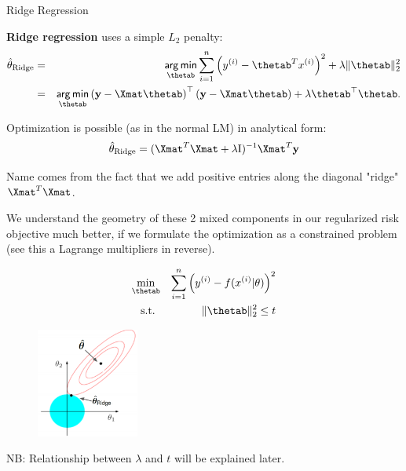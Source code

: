 \begin{vbframe}{Ridge Regression}

  \textbf{Ridge regression} uses a simple $L_2$ penalty:
  \begin{eqnarray*}  
  \thetah_{\text{Ridge}} &=& \argmin_{\thetab} \sumin \left(\yi - \thetab^T \xi \right)^2 + \lambda \|\thetab\|_2^2 \\
  &=& \argmin_{\thetab} \left(\ydat - \Xmat \thetab\right)^\top \left(\ydat - \Xmat \thetab\right) + \lambda \thetab^\top \thetab.
  \end{eqnarray*}

Optimization is possible (as in the normal LM) in analytical form:
$$\thetah_{\text{Ridge}} = (\Xmat^T \Xmat  + \lambda \id)^{-1} \Xmat^T\ydat$$

Name comes from the fact that we add positive entries along the diagonal "ridge" $\Xmat^T \Xmat$.

\framebreak 

We understand the geometry of these 2 mixed components in our regularized risk objective much better, if we formulate the optimization as a constrained problem (see this a Lagrange multipliers in reverse).

\vspace{-0.5cm}

\begin{eqnarray*}
\min_{\thetab} && \sumin \left(\yi - \fxit\right)^2 \\
  \text{s.t. } && \|\thetab\|_2^2  \leq t \\
\end{eqnarray*}

\vspace{-1.0cm}

\begin{figure}
\includegraphics[width=0.3\textwidth]{figure_man/ridge_hat.png}
\end{figure}

\begin{footnotesize} 
NB: Relationship between $\lambda$ and $t$ will be explained later.
\end{footnotesize}


\end{vbframe}
